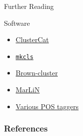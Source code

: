 \documentclass[xcolor=pdftex,x11names,table,hyperref]{beamer}
\begin{document}
\begin{frame}{Further Reading}



\begin{block}{Software}
\begin{tiny}
\begin{itemize}
	\item \href{https://github.com/jonsafari/clustercat}{ClusterCat}
	\item \href{https://github.com/moses-smt/mgiza}{\texttt{mkcls}}
	\item \href{https://github.com/percyliang/brown-cluster}{Brown-cluster}
	\item \href{https://github.com/muelletm/cistern}{MarLiN}
	\item \href{https://www.aclweb.org/aclwiki/index.php?title=Part-of-speech\_tagging\#Software}{Various POS taggers}
\end{itemize}
\end{tiny}
\end{block}

\end{frame}



\begin{frame}[allowframebreaks]
 \frametitle{References}
 \begin{tiny}
 \begin{spacing}{0.40}

\fontsize{3.0pt}{0.3pt} \selectfont

 \end{spacing}
 \end{tiny}
\end{frame}



\end{document}
